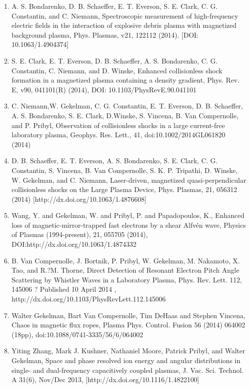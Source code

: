 \documentclass[11pt]{article}
\begin{document}
\begin{enumerate}
\item   A. S. Bondarenko, D. B. Schaeffer, E. T. Everson, S. E. Clark, C. G. Constantin, and C. Niemann, Spectroscopic measurement of high-frequency electric fields in the interaction of explosive debris plasma with magnetized background plasma, Phys. Plasmas, v21, 122112 (2014). [DOI: 10.1063/1.4904374]

\item   S. E. Clark, E. T. Everson, D. B. Schaeffer, A. S. Bondarenko, C. G. Constantin, C. Niemann, and D. Winske, Enhanced collisionless shock formation in a magnetized plasma containing a density gradient, Phys. Rev. E, v90, 041101(R) (2014), DOI: 10.1103/PhysRevE.90.041101

\item    C. Niemann,W. Gekelman, C. G. Constantin, E. T. Everson, D. B. Schaeffer, A. S. Bondarenko, S. E. Clark, D.Winske, S. Vincena, B. Van Compernolle, and P. Pribyl, Observation of collisionless shocks in a large current-free laboratory plasma, Geophys. Res. Lett., 41, doi:10.1002/2014GL061820 (2014)

\item   D. B. Schaeffer, E. T. Everson, A. S. Bondarenko, S. E. Clark, C. G. Constantin, S. Vincena, B. Van Compernolle, S. K. P. Tripathi, D. Winske, W. Gekelman, and C. Niemann, Laser-driven, magnetized quasi-perpendicular collisionless shocks on the Large Plasma Device, Phys. Plasmas, 21, 056312 (2014) [http://dx.doi.org/10.1063/1.4876608]

\item  Wang, Y. and Gekelman, W. and Pribyl, P. and Papadopoulos, K., Enhanced loss of magnetic-mirror-trapped fast electrons by a shear Alfv\'{e}n wave, Physics of Plasmas (1994-present), 21, 055705 (2014), DOI:http://dx.doi.org/10.1063/1.4874332

\item   B. Van Compernolle, J. Bortnik, P. Pribyl, W. Gekelman, M. Nakamoto, X. Tao, and R.?M. Thorne, Direct Detection of Resonant Electron Pitch Angle Scattering by Whistler Waves in a Laboratory Plasma, Phys. Rev. Lett. 112, 145006 ? Published 10 April 2014 , http://dx.doi.org/10.1103/PhysRevLett.112.145006

\item  Walter Gekelman, Bart Van Compernolle, Tim DeHaas and Stephen Vincena, Chaos in magnetic flux ropes, Plasma Phys. Control. Fusion 56 (2014) 064002 (18pp), doi:10.1088/0741-3335/56/6/064002

\item   Yiting Zhang, Mark J. Kushner, Nathaniel Moore, Patrick Pribyl, and Walter Gekelman, Space and phase resolved ion energy and angular distributions in single- and dual-frequency capacitively coupled plasmas, J. Vac. Sci. Technol. A 31(6), Nov/Dec 2013, [http://dx.doi.org/10.1116/1.4822100]


\end{enumerate}
\end{document}
